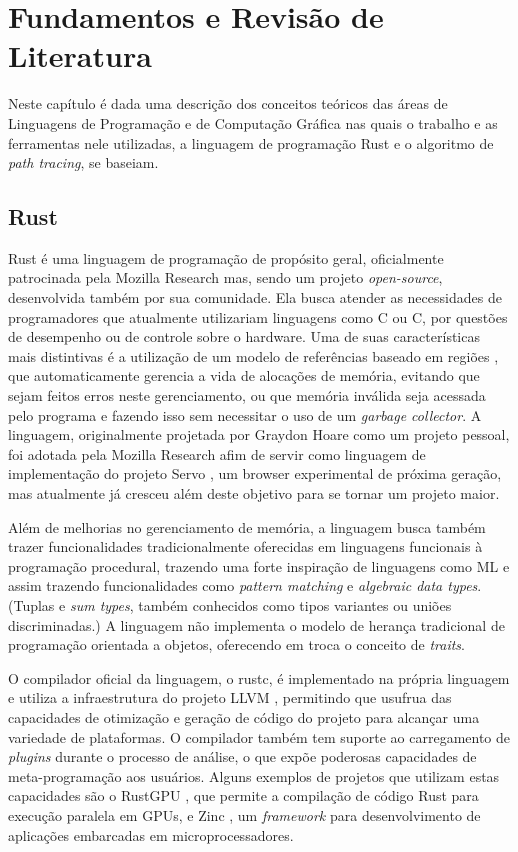 \documentclass[tg]{mdtufsm}
\def\Cpp{{C\nolinebreak[4]\raisebox{.20ex}{\small\bf++}}}
\begin{document}
\chapter{Fundamentos e Revisão de Literatura}

Neste capítulo é dada uma descrição dos conceitos teóricos das áreas de Linguagens de Programação e de Computação Gráfica nas quais o trabalho e as ferramentas nele utilizadas, a linguagem de programação Rust e o algoritmo de \emph{path tracing}, se baseiam.

\section{Rust}

Rust \citep{rust} é uma linguagem de programação de propósito geral, oficialmente patrocinada pela
Mozilla Research mas, sendo um projeto \emph{open-source}, desenvolvida também por sua comunidade. Ela busca atender as necessidades
de programadores que atualmente utilizariam linguagens como C ou
\Cpp, por questões de desempenho ou de controle sobre o hardware. Uma de suas características mais
distintivas é a utilização de um modelo de referências baseado em regiões \citep{grossman2002}, que
automaticamente gerencia a vida de alocações de memória, evitando que sejam feitos erros neste
gerenciamento, ou que memória inválida seja acessada pelo programa e fazendo isso sem necessitar o uso de um
\emph{garbage collector}. A linguagem, originalmente projetada por Graydon Hoare como um projeto
pessoal, foi adotada pela Mozilla Research afim de servir como linguagem de
implementação do projeto Servo \citep{servo}, um browser experimental de próxima geração, mas
atualmente já cresceu além deste objetivo para se tornar um projeto maior.

Além de melhorias no gerenciamento de memória, a linguagem busca também trazer funcionalidades
tradicionalmente oferecidas em linguagens funcionais à programação procedural, trazendo uma forte inspiração de linguagens
como ML \citep{milner1997} e assim trazendo funcionalidades como \emph{pattern matching} e \emph{algebraic data types}. (Tuplas e \emph{sum types}, também conhecidos como tipos variantes ou uniões discriminadas.) A linguagem não implementa o modelo de herança tradicional de programação orientada a objetos,
oferecendo em troca o conceito de \emph{traits}.

O compilador oficial da linguagem, o rustc, é implementado na própria linguagem e utiliza a
infraestrutura do projeto LLVM \citep{lattner2004}, permitindo que usufrua das capacidades de
otimização e geração de código do projeto para alcançar uma variedade de plataformas. O compilador
também tem suporte ao carregamento de \emph{plugins} durante o processo de análise, o que expõe
poderosas capacidades de meta-programação aos usuários. Alguns exemplos de projetos que utilizam
estas capacidades são o RustGPU \citep{holk2013}, que permite a compilação de código Rust para
execução paralela em GPUs, e Zinc \citep{zinc}, um \emph{framework} para desenvolvimento de
aplicações embarcadas em microprocessadores.
\end{document}
